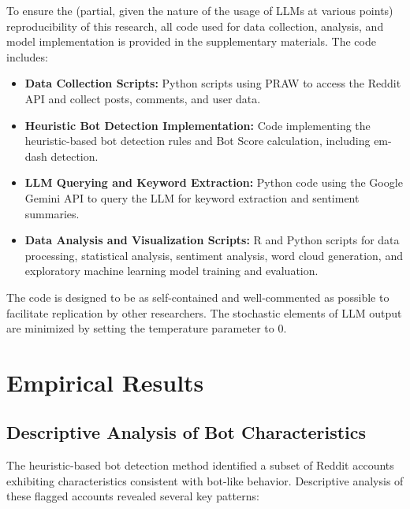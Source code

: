 \documentclass[
  12pt,
  letterpaper,
  DIV=11,
  numbers=noendperiod]{scrartcl}
\providecommand{\tightlist}{%
  \setlength{\itemsep}{0pt}\setlength{\parskip}{0pt}}\usepackage{longtable,booktabs,array}
\begin{document}
To ensure the (partial, given the nature of the usage of LLMs at various
points) reproducibility of this research, all code used for data
collection, analysis, and model implementation is provided in the
supplementary materials. The code includes:

\begin{itemize}
\tightlist
\item
  \textbf{Data Collection Scripts:} Python scripts using PRAW to access
  the Reddit API and collect posts, comments, and user data.
\item
  \textbf{Heuristic Bot Detection Implementation:} Code implementing the
  heuristic-based bot detection rules and Bot Score calculation,
  including em-dash detection.
\item
  \textbf{LLM Querying and Keyword Extraction:} Python code using the
  Google Gemini API to query the LLM for keyword extraction and
  sentiment summaries.
\item
  \textbf{Data Analysis and Visualization Scripts:} R and Python scripts
  for data processing, statistical analysis, sentiment analysis, word
  cloud generation, and exploratory machine learning model training and
  evaluation.
\end{itemize}

The code is designed to be as self-contained and well-commented as
possible to facilitate replication by other researchers. The stochastic
elements of LLM output are minimized by setting the temperature
parameter to 0.

\section{Empirical Results}\label{empirical-results}

\subsection{Descriptive Analysis of Bot
Characteristics}\label{descriptive-analysis-of-bot-characteristics}

The heuristic-based bot detection method identified a subset of Reddit
accounts exhibiting characteristics consistent with bot-like behavior.
Descriptive analysis of these flagged accounts revealed several key
patterns:
\end{document}
